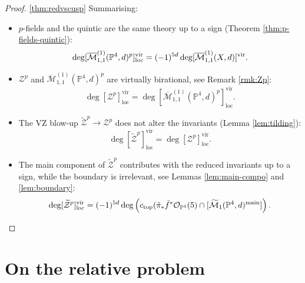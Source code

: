 \documentclass[11pt]{amsart}
\newcommand{\pazocal}{\mathcal}
\newcommand{\Mone}[3]{\overline{\pazocal M}^{(1)}_{1,#1}(#2,#3)}
\newcommand{\Zp}{\pazocal Z^p}
\newcommand{\tZp}{\widetilde{\pazocal Z}^p}
\newcommand{\PP}{\mathbb P}
\newcommand{\OO}{\mathcal{O}}
\renewcommand{\to}{\rightarrow}
\newcommand{\virloc}[1]{[#1]^{\mathrm{vir}}_{\mathrm{loc}}}
\theoremstyle{definition}
\theoremstyle{definition}
\begin{document}
\begin{proof}\ref{thm:redvscusp}
Summarising:
\begin{itemize}[leftmargin=.5cm]
\item $p$-fields and the quintic are the same theory up to a sign (Theorem \ref{thm:p-fields-quintic}): \[\deg[\Mone{1}{\PP^4}{d}^p]^{\rm{vir}}_{\rm{loc}}= (-1)^{5d}\deg[\Mone{1}{X}{d}]^{\rm{vir}}.\]
\item $\Zp$ and $\Mone{1}{\PP^4}{d}^p$ are virtually birational, see Remark \ref{rmk:Zp}:
\[\deg\virloc{\Zp}=\deg\virloc{\Mone{1}{\PP^4}{d}^p}.\]
\item The VZ blow-up $\tZp\to \Zp$ does not alter the invariants (Lemma \ref{lem:tilding}): \[\deg\virloc{\tZp}=\deg\virloc{\Zp}.\]
\item The main component of $\tZp$ contributes with the reduced invariants up to a sign, while the boundary is irrelevant, see Lemmas \ref{lem:main-compo} and \ref{lem:boundary}:
\[\deg\virloc{\tZp}=(-1)^{5d}\deg\left(c_{\rm{top}}(\tilde\pi_*\tilde f^*\OO_{\PP^4}(5)\cap[\widetilde{\pazocal M}_1(\PP^4,d)^{\rm{main}}]\right).\]
\end{itemize}


\end{proof}
\section{On the relative problem}




\end{document}
